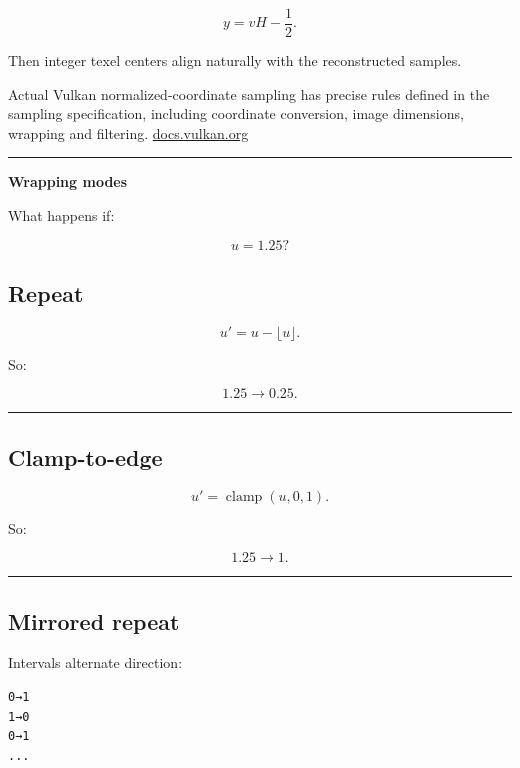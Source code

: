 \[
y=vH-\frac12.
\]

Then integer texel centers align naturally with the reconstructed samples.

Actual Vulkan normalized-coordinate sampling has precise rules defined in the sampling specification, including coordinate conversion, image dimensions, wrapping and filtering. \href{https://docs.vulkan.org/spec/latest/chapters/textures.html?utm_source=chatgpt.com}{docs.vulkan.org}

\begin{center}\rule{0.5\linewidth}{0.5pt}\end{center}

\textbf{Wrapping modes}

What happens if:

\[
u=1.25?
\]

\subsection{Repeat}\label{03-visual-computing-i-ch019-repeat}

\[
u'=u-\lfloor u\rfloor.
\]

So:

\[
1.25\rightarrow0.25.
\]

\begin{center}\rule{0.5\linewidth}{0.5pt}\end{center}

\subsection{Clamp-to-edge}\label{03-visual-computing-i-ch019-clamp-to-edge}

\[
u'=
\operatorname{clamp}(u,0,1).
\]

So:

\[
1.25\rightarrow1.
\]

\begin{center}\rule{0.5\linewidth}{0.5pt}\end{center}

\subsection{Mirrored repeat}\label{03-visual-computing-i-ch019-mirrored-repeat}

Intervals alternate direction:

\begin{verbatim}
0→1
1→0
0→1
...
\end{verbatim}

